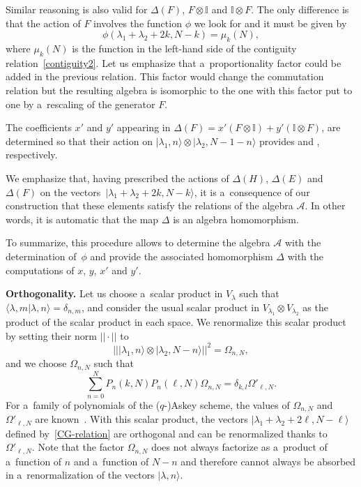 \documentclass[pdftex]{sigma}
\numberwithin{equation}{section}
\theoremstyle{definition}
\begin{document}
Similar reasoning is also valid for $\Delta(F)$, $F\otimes \mathbb{I}$ and $\mathbb{I} \otimes F$. The only difference is that the action of $F$ involves the function $\phi$ we look for and it must be given by
\begin{equation}\label{eq:phimu}
 \phi(\lambda_1+\lambda_2+2k,N-k)=\mu_k(N),
\end{equation}
where $\mu_k(N)$ is the function in the left-hand side of the contiguity relation~\eqref{contiguity2}. Let us emphasize that a~proportionality factor could be added in the previous relation. This factor would change the commutation relation but the resulting algebra is isomorphic to the one with this factor put to one by a~rescaling of the generator $F$.

The coefficients $x'$ and $y'$ appearing in
$\Delta(F)=x'(F\otimes \mathbb{I})+y'(\mathbb{I}\otimes F)$,
are determined so that their action on $|\lambda_1,n\rangle\otimes |\lambda_2,N-1-n\rangle$ provides  and , respectively.

We emphasize that, having prescribed the actions of $\Delta(H)$, $\Delta(E)$ and $\Delta(F)$ on the vectors~${|\lambda_1+\lambda_2+2k,N-k\rangle}$, it is a~consequence of our construction that these elements satisfy the relations of the algebra $\mathcal{A}$. In other words, it is automatic that the map $\Delta$ is an algebra homomorphism.

To summarize, this procedure allows to determine the algebra $\mathcal{A}$ with the determination of~$\phi$ and provide the associated homomorphism $\Delta$ with the computations of $x$, $y$, $x'$ and $y'$.

{\bf Orthogonality.} Let us choose a~scalar product in $V_{\lambda}$ such that
$
 \langle \lambda,m|\lambda,n \rangle=\delta_{n,m}$,
and consider the usual scalar product in $V_{\lambda_1}\otimes V_{\lambda_2}$ as the product of the scalar product in each space. We renormalize this scalar product by setting their norm $||\cdot ||$ to
\[\big|\big| |\lambda_1,n\rangle\otimes |\lambda_2,N-n\rangle\big|\big|^2=\Omega_{n,N},\]
and we choose $\Omega_{n,N}$ such that
\[\sum_{n=0}^NP_n(k,N)P_n(\ell,N)\Omega_{n,N}=\delta_{k,l}\Omega'_{\ell,N} .\]
For a~family of polynomials of the ($q$-)Askey scheme, the values of $\Omega_{n,N}$ and $\Omega'_{\ell,N}$ are known~\cite{KLS10}. With this scalar product, the vectors $|\lambda_1+\lambda_2+2\ell,N-\ell \rangle$ defined by~\eqref{CG-relation} are orthogonal and can be renormalized thanks to $\Omega'_{\ell,N}$. Note that the factor $\Omega_{n,N}$ does not always factorize as a~product of a~function of $n$ and a~function of $N-n$ and therefore cannot always be absorbed in a~renormalization of the vectors $|\lambda,n\rangle$.
\end{document}
